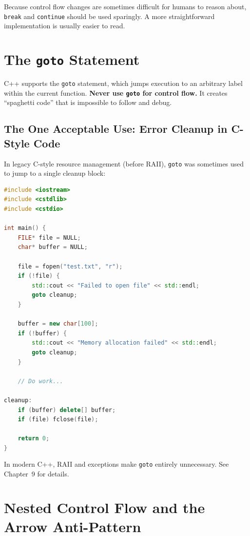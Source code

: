 Because control flow changes are sometimes difficult for humans to reason about, \texttt{break} and \texttt{continue} should be used sparingly. A more straightforward implementation is usually easier to read.

\section{The \texttt{goto} Statement}
\label{sec:goto}

C++ supports the \texttt{goto} statement, which jumps execution to an arbitrary label within the current function. \textbf{Never use \texttt{goto} for control flow.} It creates ``spaghetti code'' that is impossible to follow and debug.

\subsection{The One Acceptable Use: Error Cleanup in C-Style Code}

In legacy C-style resource management (before RAII), \texttt{goto} was sometimes used to jump to a single cleanup block:

\begin{lstlisting}[language=C++, caption={goto for error cleanup (C-style pattern)}]
#include <iostream>
#include <cstdlib>
#include <cstdio>

int main() {
    FILE* file = NULL;
    char* buffer = NULL;

    file = fopen("test.txt", "r");
    if (!file) {
        std::cout << "Failed to open file" << std::endl;
        goto cleanup;
    }

    buffer = new char[100];
    if (!buffer) {
        std::cout << "Memory allocation failed" << std::endl;
        goto cleanup;
    }

    // Do work...

cleanup:
    if (buffer) delete[] buffer;
    if (file) fclose(file);

    return 0;
}
\end{lstlisting}

In modern C++, RAII and exceptions make \texttt{goto} entirely unnecessary. See Chapter~9 for details.

\section{Nested Control Flow and the Arrow Anti-Pattern}
\label{sec:nested-flow}

